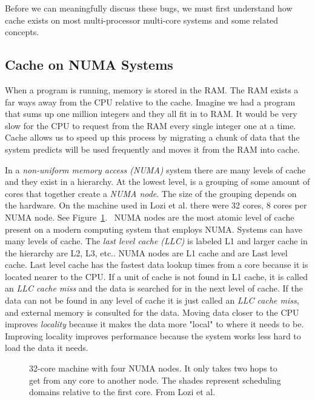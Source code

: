 \documentclass{sig-alternate}
\begin{document}
Before we can meaningfully discuss these bugs, we must first understand how cache exists on most multi-processor multi-core systems and some related concepts.

\subsection{Cache on NUMA Systems}
\label{sec:cache}

When a program is running, memory is stored in the RAM. The RAM exists a far ways away from the CPU relative to the cache. Imagine we had a program that sums up one million integers and they all fit in to RAM. It would be very slow for the CPU to request from the RAM every single integer one at a time. Cache allows us to speed up this process by migrating a chunk of data that the system predicts will be used frequently and moves it from the RAM into cache.

In a \emph{non-uniform memory access (NUMA)} system  there are many levels of cache and they exist in a hierarchy. At the lowest level, is a grouping of some amount of cores that together create a \emph{NUMA node}. The size of the grouping depends on the hardware. On the machine used in Lozi et al. there were 32 cores, 8 cores per NUMA node. See Figure~\ref{fig:NUMA}.~\cite{Lozi:2016} NUMA nodes are the most atomic level of cache present on a modern computing system that employs NUMA. Systems can have many levels of cache. The \emph{last level cache (LLC)} is labeled L1 and larger cache in the hierarchy are L2, L3, etc.. NUMA nodes are L1 cache and are Last level cache. Last level cache has the fastest data lookup times from a core because it is located nearer to the CPU. If a unit of cache is not found in L1 cache, it is called an \emph{LLC cache miss} and the data is searched for in the next level of cache. If the data can not be found in any level of cache it is just called an \emph{LLC cache miss}, and external memory is consulted for the data. Moving data closer to the CPU improves \emph{locality} because it makes the data more "local" to where it needs to be. Improving locality improves performance because the system works less hard to load the data it needs.~\cite{WikiCache}


\begin{figure}
\centering
{}
\caption{32-core machine with four NUMA nodes. It only takes two hops to get from any core to another node. The shades represent scheduling domains relative to the first core.  From Lozi et al.~\cite{Lozi:2016}}
\label{fig:NUMA}
\end{figure}
\end{document}

